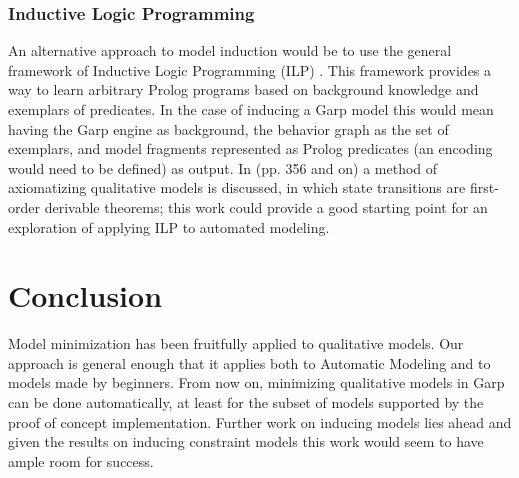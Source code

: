 \documentclass{article} %
\begin{document}
\subsubsection{Inductive Logic Programming}

An alternative approach to model induction would be to use the general
framework of Inductive Logic Programming (ILP) \cite{mitchell}. This framework
provides a way to learn arbitrary Prolog programs based on background knowledge
and exemplars of predicates. In the case of inducing a Garp model this would
mean having the Garp engine as background, the behavior graph as the set of
exemplars, and model fragments represented as Prolog predicates (an encoding
would need to be defined) as output. In \cite{kuipers} (pp. 356 and on) a
method of axiomatizing qualitative models is discussed, in which state
transitions are first-order derivable theorems; this work could provide a good
starting point for an exploration of applying ILP to automated modeling.



\section{Conclusion}

Model minimization has been fruitfully applied to qualitative models. Our
approach is general enough that it applies both to Automatic Modeling and to
models made by beginners. From now on, minimizing qualitative models in Garp
can be done automatically, at least for the subset of models supported by the
proof of concept implementation. Further work on inducing models lies ahead
and given the results on inducing constraint models this work would seem to
have ample room for success.
\end{document}

